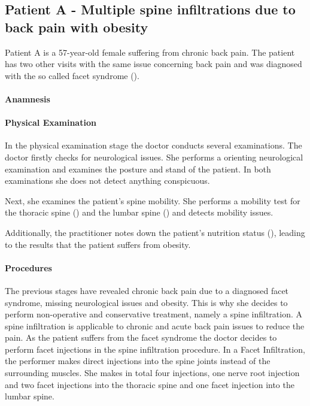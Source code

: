 \subsection{Patient A - Multiple spine infiltrations due to back pain with obesity}\label{subsec:patient-a---multiple-spine-infiltrations-due-to-backpain-with-obesity}
Patient A is a 57-year-old female suffering from chronic back pain.
The patient has two other visits with the same issue concerning back pain and was diagnosed with the so called facet syndrome ().

\paragraph{Anamnesis}


\paragraph{Physical Examination}
In the physical examination stage the doctor conducts several examinations.
The doctor firstly checks for neurological issues.
She performs a orienting neurological examination and examines the posture and stand of the patient.
In both examinations she does not detect anything conspicuous.

Next, she examines the patient's spine mobility.
She performs a mobility test for the thoracic spine () and the lumbar spine () and detects mobility issues.


Additionally, the practitioner notes down the patient's nutrition status (), leading to the results that the patient suffers from obesity.

\paragraph{Procedures}

The previous stages have revealed chronic back pain due to a diagnosed facet syndrome, missing neurological issues and obesity.
This is why she decides to perform non-operative and conservative treatment, namely a spine infiltration.
A spine infiltration is applicable to chronic and acute back pain issues to reduce the pain.
As the patient suffers from the facet syndrome the doctor decides to perform facet injections in the spine infiltration procedure.
In a Facet Infiltration, the performer makes direct injections into the spine joints instead of the surrounding muscles.
She makes in total four injections, one nerve root injection and two facet injections into the thoracic spine and one facet injection into the lumbar spine.

